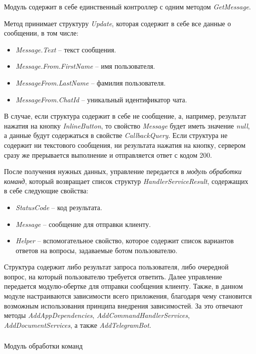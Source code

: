 Модуль содержит в себе единственный контроллер с одним методом \emph{GetMessage}.

Метод принимает структуру \emph{Update}, которая содержит в себе все данные о сообщении, в том числе:

\begin{itemize}
	\item \emph{Message.Text} – текст сообщения.
	\item \emph{Message.From.FirstName} – имя пользователя.
	\item \emph{MessageFrom.LastName} – фамилия пользователя.
	\item \emph{MessageFrom.ChatId} – уникальный идентификатор чата.
\end{itemize}

В случае, если структура содержит в себе не сообщение, а, например, результат нажатия на кнопку \emph{InlineButton}, то свойство \emph{Message} будет иметь значение \emph{null}, а данные будут содержаться в свойстве \emph{CallbackQuery}.
Если структура не содержит ни текстового сообщения, ни результата нажатия на кнопку, сервером сразу же прерывается выполнение и отправляется ответ с кодом 200.

После получения нужных данных, управление передается в \emph{модуль обработки команд}, который возвращает список структур \emph{HandlerServiceResult}, содержащих в себе следующие свойства:

\begin{itemize}
	\item \emph{StatusCode} – код результата.
	\item \emph{Message} – сообщение для отправки клиенту.
	\item \emph{Helper} – вспомогательное свойство, которое содержит список
вариантов ответов на вопросы, задаваемые ботом пользователю.
\end{itemize}

Структура содержит либо результат запроса пользователя, либо очередной вопрос, на который пользователю требуется ответить.
Далее управление передается модулю-обертке для отправки сообщения клиенту.
Также, в данном модуле настраиваются зависимости всего приложения, благодаря чему становится возможным использования принципа внедрения зависимостей. За это отвечают методы \emph{AddAppDependencies}, \emph{AddCommandHandler\linebreak Services}, \emph{AddDocumentServices}, а также \emph{AddTelegramBot}.

\subsubsection{} Модуль обработки команд
\label{sec:design:server:framework}


